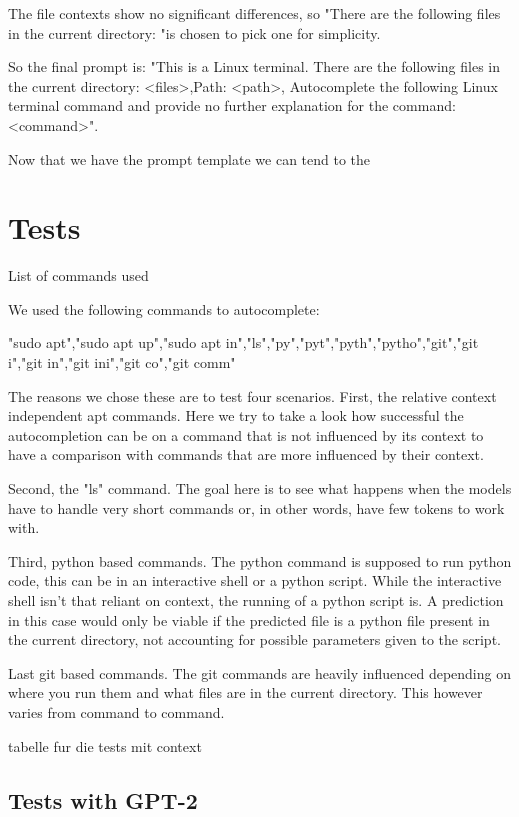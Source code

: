 The file contexts show no significant differences, so "There are the following files in the current  directory: "is chosen to pick one for simplicity.




So the final prompt is: "This is a Linux terminal. There are the following files in the current  directory: <files>,Path: <path>, Autocomplete the following Linux terminal command and provide no further explanation for the command: <command>".



Now that we have the prompt template we can tend to the 

\section{Tests}
List of commands used

We used the following commands to autocomplete:

"sudo apt","sudo apt up","sudo apt in","ls","py","pyt","pyth","pytho","git","git i","git in","git ini","git co","git comm"


The reasons we chose these are to test four scenarios. First, the relative context independent apt commands. Here we try to take a look how successful the autocompletion can be on a command that is not influenced by its context to have a comparison with commands that are more influenced by their context.



Second, the  "ls" command. The goal here is to see what happens when the models have to handle very short commands or, in other words, have few tokens to work with.



Third, python based commands. The python command is supposed to run python code, this can be in an interactive shell or a python script. While the interactive shell isn't that reliant on context, the running of a python script is. A prediction in this case would only be viable if the predicted file is a python file present in the current directory, not accounting for possible parameters given to the script.



Last git based commands. The git commands are heavily influenced depending on where you run them and what files are in the current directory. This however varies from command to command.


tabelle fur die tests mit context
\pagebreak
\subsection{Tests with GPT-2}\raggedbottom

